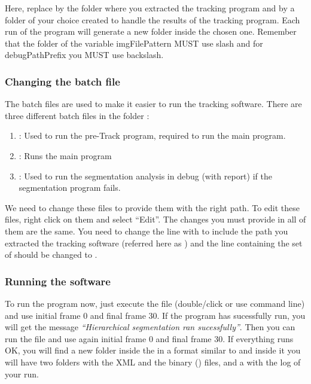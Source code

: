 \documentclass[12pt]{article}
\begin{document}
Here, replace  by the folder where you extracted the tracking program and  by a folder of your choice created to handle the results of the tracking program. Each run of the program will generate a new folder inside the chosen one. Remember that the folder of the variable imgFilePattern MUST use slash and for debugPathPrefix you MUST use backslash.

\subsubsection{Changing the batch file}

The batch files are used to make it easier to run the tracking software. There are three different batch files in the folder :

\begin{enumerate}
\item{: Used to run the pre-Track program, required to run the main program.}
\item{: Runs the main program}
\item{: Used to run the segmentation analysis in debug (with report) if the segmentation program fails.}
\end{enumerate}

We need to change these files to provide them with the right path. To edit these files, right click on them and select ``Edit''. The changes you must provide in all of them are the same. You need to change the line with  to include the path you extracted the tracking software (referred here as ) and the line containing the set of  should be changed to .

\subsubsection{Running the software}

To run the program now, just execute the file  (double/click or use command line) and use initial frame 0 and final frame 30. If the program has sucessfully run, you will get the message \textit{``Hierarchical segmentation ran sucessfully''}. Then you can run the file  and use again initial frame 0 and final frame 30. If everything runs OK, you will find a new folder inside the  in a format similar to  and inside it you will have two folders with the XML and the binary () files, and a  with the log of your run.



\end{document}
